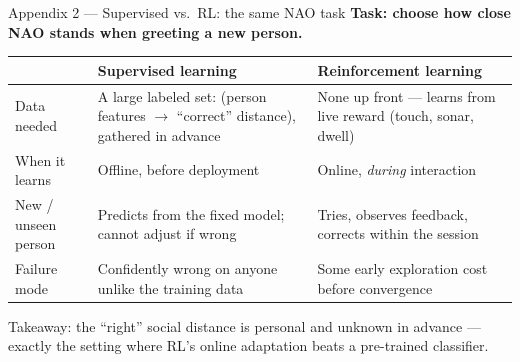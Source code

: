 \documentclass[aspectratio=169,10pt]{beamer}
\begin{document}
\begin{frame}{Appendix 2 --- Supervised vs.\ RL: the same NAO task}
  \footnotesize
  \textbf{Task: choose how close NAO stands when greeting a new person.}
  \begin{table}
    \begin{tabular}{@{}>{\raggedright\arraybackslash}p{2.1cm}>{\raggedright\arraybackslash}p{4.1cm}>{\raggedright\arraybackslash}p{4.7cm}@{}}
      \toprule
       & \textbf{Supervised learning} & \textbf{Reinforcement learning} \\
      \midrule
      Data needed & A large labeled set: (person features $\to$ ``correct'' distance), gathered in advance & None up front --- learns from live reward (touch, sonar, dwell) \\
      \addlinespace
      When it learns & Offline, before deployment & Online, \emph{during} interaction \\
      \addlinespace
      New / unseen person & Predicts from the fixed model; cannot adjust if wrong & Tries, observes feedback, corrects within the session \\
      \addlinespace
      Failure mode & Confidently wrong on anyone unlike the training data & Some early exploration cost before convergence \\
      \bottomrule
    \end{tabular}
  \end{table}
  \vspace{0.2em}
  \alert{Takeaway:} the ``right'' social distance is personal and unknown in advance --- exactly the setting where RL's online adaptation beats a pre-trained classifier.
\end{frame}
\end{document}
